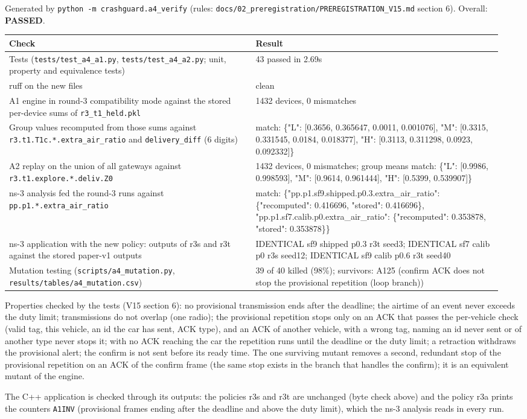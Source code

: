 


Generated by \texttt{python -m crashguard.a4\_verify} (rules: \texttt{docs/02\_preregistration/PREREGISTRATION\_V15.md} section 6). Overall: \textbf{PASSED}.

{\scriptsize\raggedright
\begin{longtable}{p{0.475\linewidth}p{0.475\linewidth}}
\toprule
Check & Result \\
\midrule
\endhead
Tests (\texttt{tests/test\_a4\_a1.py}, \texttt{tests/test\_a4\_a2.py}; unit, property and equivalence tests) & 43 passed in 2.69s \\
ruff on the new files & clean \\
A1 engine in round-3 compatibility mode against the stored per-device sums of \texttt{r3\_t1\_held.pkl} & 1432 devices, 0 mismatches \\
Group values recomputed from those sums against \texttt{r3.t1.T1c.*.extra\_air\_ratio} and \texttt{delivery\_diff} (6 digits) & match: \{"L": [0.3656, 0.365647, 0.0011, 0.001076], "M": [0.3315, 0.331545, 0.0184, 0.018377], "H": [0.3113, 0.311298, 0.0923, 0.092332]\} \\
A2 replay on the union of all gateways against \texttt{r3.t1.explore.*.deliv.Z0} & 1432 devices, 0 mismatches; group means match: \{"L": [0.9986, 0.998593], "M": [0.9614, 0.961444], "H": [0.5399, 0.539907]\} \\
ns-3 analysis fed the round-3 runs against \texttt{pp.p1.*.extra\_air\_ratio} & match: \{"pp.p1.sf9.shipped.p0.3.extra\_air\_ratio": \{"recomputed": 0.416696, "stored": 0.416696\}, "pp.p1.sf7.calib.p0.extra\_air\_ratio": \{"recomputed": 0.353878, "stored": 0.353878\}\} \\
ns-3 application with the new policy: outputs of r3s and r3t against the stored paper-v1 outputs & IDENTICAL sf9 shipped p0.3 r3t seed3; IDENTICAL sf7 calib p0 r3s seed12; IDENTICAL sf9 calib p0.6 r3t seed40 \\
Mutation testing (\texttt{scripts/a4\_mutation.py}, \texttt{results/tables/a4\_mutation.csv}) & 39 of 40 killed (98\%); survivors: A125 (confirm ACK does not stop the provisional repetition (loop branch)) \\
\bottomrule
\end{longtable}}

Properties checked by the tests (V15 section 6): no provisional transmission ends after the deadline; the airtime of an event never exceeds the duty limit; transmissions do not overlap (one radio); the provisional repetition stops only on an
ACK that passes the per-vehicle check (valid tag, this vehicle, an id the car has sent, ACK type), and an ACK of another vehicle, with a wrong tag, naming an id never sent or of another type never stops it; with no ACK reaching the car the
repetition runs until the deadline or the duty limit; a retraction withdraws the provisional alert; the confirm is not sent before its ready time. The one surviving mutant removes a second, redundant stop of the provisional repetition on an
ACK of the confirm frame (the same stop exists in the branch that handles the confirm); it is an equivalent mutant of the engine.

The C++ application is checked through its outputs: the policies r3s and r3t are unchanged (byte check above) and the policy r3a prints the counters \texttt{A1INV} (provisional frames ending after the deadline and above the duty limit), which the ns-3 analysis reads in every run.

